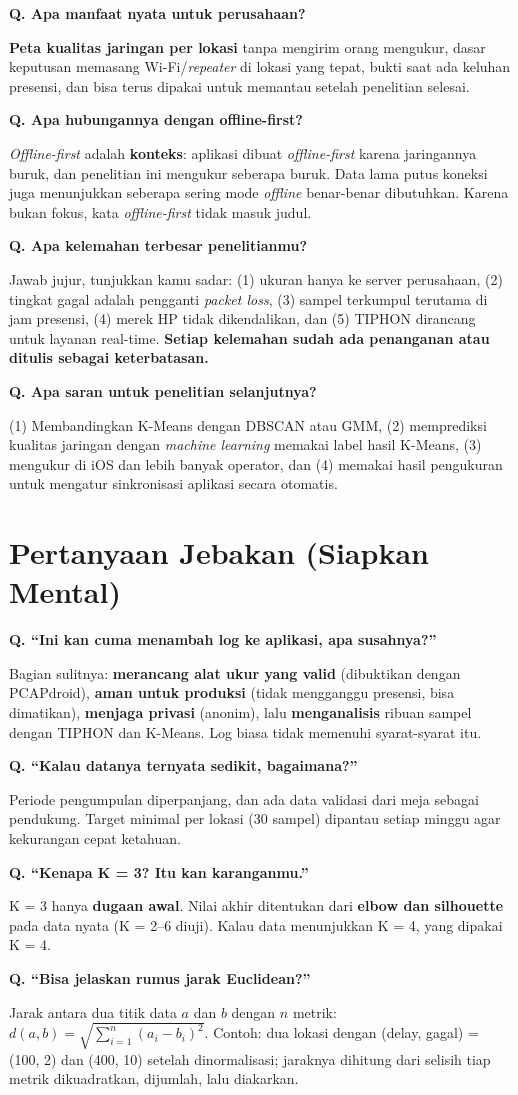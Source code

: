 \documentclass[11pt,a4paper]{article}
\newcounter{q}
\newcommand{\tanya}[2]{\stepcounter{q}%
\par\vspace{6pt}\noindent\colorbox{band}{\parbox{\dimexpr\linewidth-2\fboxsep}{\textbf{Q\arabic{q}. #1}}}\par\vspace{2pt}#2\par}
\begin{document}
\tanya{Apa manfaat nyata untuk perusahaan?}{\textbf{Peta kualitas jaringan per lokasi} tanpa mengirim orang mengukur, dasar keputusan memasang Wi-Fi/\textit{repeater} di lokasi yang tepat, bukti saat ada keluhan presensi, dan bisa terus dipakai untuk memantau setelah penelitian selesai.}

\tanya{Apa hubungannya dengan offline-first?}{\textit{Offline-first} adalah \textbf{konteks}: aplikasi dibuat \textit{offline-first} karena jaringannya buruk, dan penelitian ini mengukur seberapa buruk. Data lama putus koneksi juga menunjukkan seberapa sering mode \textit{offline} benar-benar dibutuhkan. Karena bukan fokus, kata \textit{offline-first} tidak masuk judul.}

\tanya{Apa kelemahan terbesar penelitianmu?}{Jawab jujur, tunjukkan kamu sadar: (1) ukuran hanya ke server perusahaan, (2) tingkat gagal adalah pengganti \textit{packet loss}, (3) sampel terkumpul terutama di jam presensi, (4) merek HP tidak dikendalikan, dan (5) TIPHON dirancang untuk layanan real-time. \textbf{Setiap kelemahan sudah ada penanganan atau ditulis sebagai keterbatasan.}}

\tanya{Apa saran untuk penelitian selanjutnya?}{(1) Membandingkan K-Means dengan DBSCAN atau GMM, (2) memprediksi kualitas jaringan dengan \textit{machine learning} memakai label hasil K-Means, (3) mengukur di iOS dan lebih banyak operator, dan (4) memakai hasil pengukuran untuk mengatur sinkronisasi aplikasi secara otomatis.}

\section{Pertanyaan Jebakan (Siapkan Mental)}

\tanya{``Ini kan cuma menambah log ke aplikasi, apa susahnya?''}{Bagian sulitnya: \textbf{merancang alat ukur yang valid} (dibuktikan dengan PCAPdroid), \textbf{aman untuk produksi} (tidak mengganggu presensi, bisa dimatikan), \textbf{menjaga privasi} (anonim), lalu \textbf{menganalisis} ribuan sampel dengan TIPHON dan K-Means. Log biasa tidak memenuhi syarat-syarat itu.}

\tanya{``Kalau datanya ternyata sedikit, bagaimana?''}{Periode pengumpulan diperpanjang, dan ada data validasi dari meja sebagai pendukung. Target minimal per lokasi (30 sampel) dipantau setiap minggu agar kekurangan cepat ketahuan.}

\tanya{``Kenapa K = 3? Itu kan karanganmu.''}{K = 3 hanya \textbf{dugaan awal}. Nilai akhir ditentukan dari \textbf{elbow dan silhouette} pada data nyata (K = 2--6 diuji). Kalau data menunjukkan K = 4, yang dipakai K = 4.}

\tanya{``Bisa jelaskan rumus jarak Euclidean?''}{Jarak antara dua titik data $a$ dan $b$ dengan $n$ metrik: $d(a,b) = \sqrt{\sum_{i=1}^{n}(a_i - b_i)^2}$. Contoh: dua lokasi dengan (delay, gagal) = (100, 2) dan (400, 10) setelah dinormalisasi; jaraknya dihitung dari selisih tiap metrik dikuadratkan, dijumlah, lalu diakarkan.}
\end{document}
